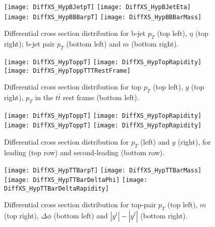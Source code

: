 \begin{figure}
  \texttt{[image: DiffXS\_HypBJetpT]}
  \texttt{[image: DiffXS\_HypBJetEta]}\\
  \texttt{[image: DiffXS\_HypBBBarpT]}
  \texttt{[image: DiffXS\_HypBBBarMass]}
\caption{Differential cross section distribution for b-jet $p_T$ (top left), $\eta$ (top right); b-jet pair $p_T$ (bottom left) and $m$ (bottom right).}
\end{figure}




\begin{figure}
  \texttt{[image: DiffXS\_HypToppT]}
  \texttt{[image: DiffXS\_HypTopRapidity]}\\
  \texttt{[image: DiffXS\_HypToppTTTRestFrame]}
\caption{Differential cross section distribution for top $p_T$ (top left), $y$ (top right), $p_T$ in the $t\bar{t}$ rest frame (bottom left).}
\end{figure}

\begin{figure}
  \texttt{[image: DiffXS\_HypToppT]}
  \texttt{[image: DiffXS\_HypTopRapidity]}\\
  \texttt{[image: DiffXS\_HypToppT]}
  \texttt{[image: DiffXS\_HypTopRapidity]}\\
\caption{Differential cross section distribution for $p_T$ (left) and $y$ (right), for leading (top row) and second-leading (bottom row).}
\end{figure}



\begin{figure}
  \texttt{[image: DiffXS\_HypTTBarpT]}
  \texttt{[image: DiffXS\_HypTTBarMass]}\\
  \texttt{[image: DiffXS\_HypTTBarDeltaPhi]}
  \texttt{[image: DiffXS\_HypTTBarDeltaRapidity]}
\caption{Differential cross section distribution for top-pair $p_T$ (top left), $m$ (top right), $\Delta\phi$ (bottom left) and $|y^t| - |y^{\bar{t}}|$ (bottom right).}
\end{figure}
